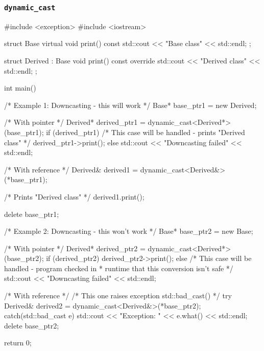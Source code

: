 \documentclass[../main]{subfiles}
\begin{document}
        \subsubsection{\texttt{dynamic\_cast}}
        \begin{Code}
            #include <exception>
            #include <iostream>
            
            struct Base
            {
                virtual void print() const
                {
                    std::cout << "Base class" << std::endl;
                }
            };
            
            struct Derived : Base
            {
                void print() const override
                {
                    std::cout << "Derived class" << std::endl;
                }
            };
            
            int main() {
                /* Example 1: Downcasting - this will work */
                Base* base_ptr1 = new Derived;
                
                /* With pointer */
                Derived* derived_ptr1 = dynamic_cast<Derived*>(base_ptr1);
                if (derived_ptr1)
                {
                    /* This case will be handled - prints "Derived class" */
                    derived_ptr1->print();
                }
                else
                {
                    std::cout << "Downcasting failed" << std::endl;
                }
                
                /* With reference */
                Derived& derived1 = dynamic_cast<Derived&>(*base_ptr1);
                
                /* Prints "Derived class" */
                derived1.print();
            
                delete base_ptr1;
            
            
                /* Example 2: Downcasting - this won't work */
                Base* base_ptr2 = new Base;
                
                /* With pointer */
                Derived* derived_ptr2 = dynamic_cast<Derived*>(base_ptr2);
                if (derived_ptr2)
                {
                    derived_ptr2->print();
                }
                else
                {
                    /* This case will be handled - program checked in
                     * runtime that this conversion isn't safe */
                    std::cout << "Downcasting failed" << std::endl;
                }
                
                /* With reference */
                /* This one raises exception std::bad_cast() */
                try 
                {
                    Derived& derived2 = dynamic_cast<Derived&>(*base_ptr2);
                }
                catch(std::bad_cast e)
                {
                    std::cout << "Exception: " << e.what() << std::endl;
                    delete base_ptr2;
                }
            
                return 0;
            }
        \end{Code}
        
\end{document}

